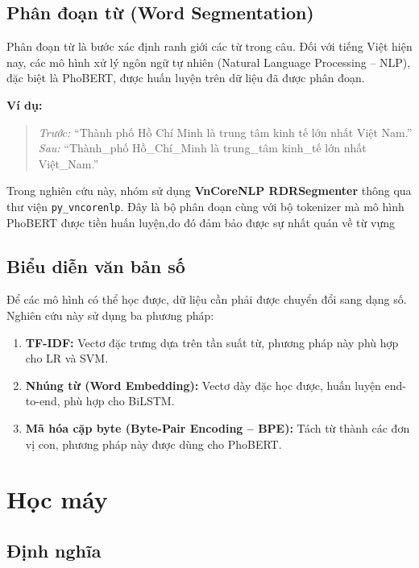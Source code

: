 \documentclass[12pt, a4paper]{report}
\newcommand{\phobert}{PhoBERT\xspace}
\begin{document}
\subsection{Phân đoạn từ (Word Segmentation)}

Phân đoạn từ là bước xác định ranh giới các từ trong câu. Đối với tiếng Việt hiện nay, các mô hình xử lý ngôn ngữ tự nhiên (Natural Language Processing -- NLP), đặc biệt là PhoBERT, được huấn luyện trên dữ liệu đã được phân đoạn.

\textbf{Ví dụ:}
\begin{quote}
\textit{Trước:} ``Thành phố Hồ Chí Minh là trung tâm kinh tế lớn nhất Việt Nam.''\\
\textit{Sau:} ``Thành\_phố Hồ\_Chí\_Minh là trung\_tâm kinh\_tế lớn nhất Việt\_Nam.''
\end{quote}

Trong nghiên cứu này, nhóm sử dụng \textbf{VnCoreNLP RDRSegmenter} thông qua thư viện \texttt{py\_vncorenlp}. Đây là bộ phân đoạn cùng với bộ tokenizer mà mô hình \phobert được tiền huấn luyện,do đó đảm bảo được sự nhất quán về từ vựng

\subsection{Biểu diễn văn bản số}

Để các mô hình có thể học được, dữ liệu cần phải được chuyển đổi sang dạng số. Nghiên cứu này sử dụng ba phương pháp:

\begin{enumerate}[leftmargin=2.5em]
  \item \textbf{TF-IDF:} Vectơ đặc trưng dựa trên tần suất từ, phương pháp này phù hợp cho LR và SVM.
  \item \textbf{Nhúng từ (Word Embedding):} Vectơ dày đặc học được, huấn luyện end-to-end, phù hợp cho BiLSTM.
  \item \textbf{Mã hóa cặp byte (Byte-Pair Encoding -- BPE):} Tách từ thành các đơn vị con, phương pháp này được dùng cho PhoBERT.
\end{enumerate}

\section{Học máy}

\subsection{Định nghĩa}
\end{document}

